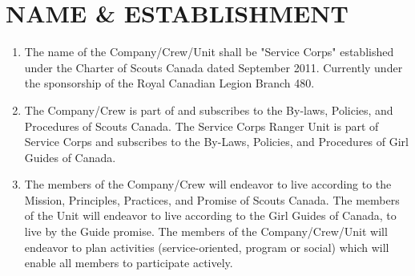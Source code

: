 \documentclass{Service_Corps_Document}
\begin{document}
\def \Title {Constitution}
\def \Company {Service Corps}
\def \versionNumber {4.1}
\stdFooter
\begin{titlepage}
	\stdTitlePage
\end{titlepage}

\tableofcontents	
		
\newpage
\section{NAME \& ESTABLISHMENT}
\begin{enumerate}
	\item The name of the Company/Crew/Unit shall be "Service Corps" established under the Charter of Scouts Canada dated September 2011. Currently under the sponsorship of the Royal Canadian Legion Branch 480.
	\item The Company/Crew is part of and subscribes to the By-laws, Policies, and Procedures of Scouts Canada. The Service Corps Ranger Unit is part of Service Corps and subscribes to the By-Laws, Policies, and Procedures of Girl Guides of Canada.
	\item The members of the Company/Crew will endeavor to live according to the Mission, Principles, Practices, and Promise of Scouts Canada. The members of the Unit will endeavor to live according to the Girl Guides of Canada, to live by the Guide promise. The members of the Company/Crew/Unit will endeavor to plan activities (service-oriented, program or social) which will enable all members to participate actively.
\end{enumerate}	
\end{document}
